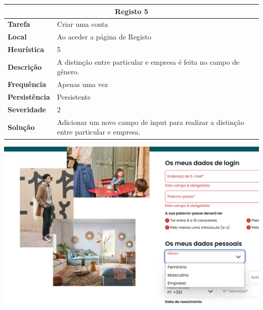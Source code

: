 \documentclass[a4paper,12pt]{article}
\begin{document}
\begin{center}
    \newpage
    \begin{table}[h!]
        \centering
        \begin{tabular}{|m{3cm}|m{12cm}|}
            \hline
            \multicolumn{2}{|c|}{\textbf{Registo 5}}                                                                       \\ \hline
            \textbf{Tarefa}       & Criar uma conta                                                                        \\ \hline
            \textbf{Local}        & Ao aceder a página de Registo                                                          \\ \hline
            \textbf{Heurística}   & 5                                                                                      \\ \hline
            \textbf{Descrição}    & A distinção entre particular e empresa é feita no campo de gênero.                     \\ \hline
            \textbf{Frequência}   & Apenas uma vez                                                                         \\ \hline
            \textbf{Persistência} & Persistente                                                                            \\ \hline
            \textbf{Severidade}   & 2                                                                                      \\ \hline
            \textbf{Solução}      & Adicionar um novo campo de input para realizar a distinção entre particular e empresa. \\ \hline
        \end{tabular}
    \end{table}

    \vspace{0.5cm}
    \includegraphics[width=\textwidth, keepaspectratio]{heuristics/04genero_registo.png}


\end{center}
\end{document}
